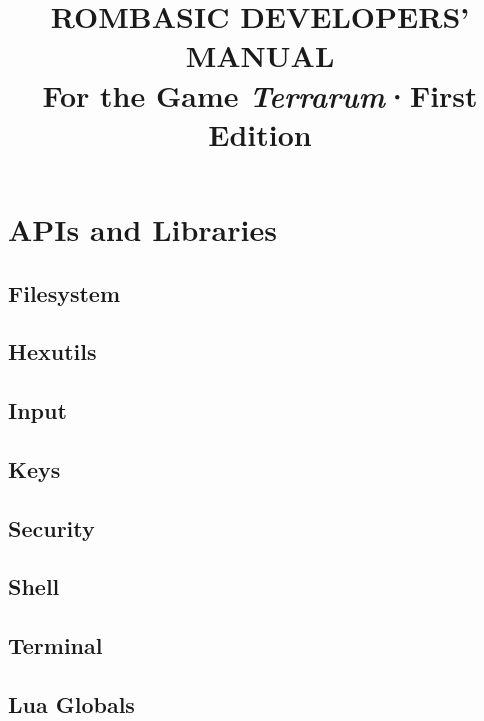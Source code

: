 \documentclass[10pt, stock]{memoir}
\title{\textbf{ROMBASIC DEVELOPERS' \\ MANUAL} \\ \vspace{7mm} \large For the Game \emph{Terrarum}\quad ·\quad First Edition}
\date{}
\author{}
\let\oldsection\section
\renewcommand\section{\clearpage\oldsection}
\begin{document}
\begin{titlingpage}
\maketitle{}
\end{titlingpage}

\setcounter{page}{3}

\tableofcontents*



\chapter{APIs and Libraries}

\section{Filesystem}


\section{Hexutils}


\section{Input}


\section{Keys}


\section{Security}


\section{Shell}


\section{Terminal}


\section{Lua Globals}

\end{document}
